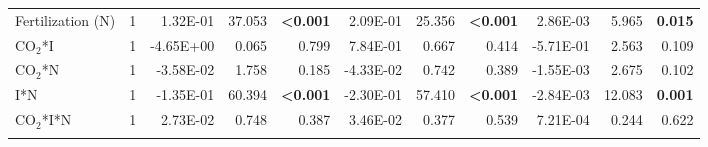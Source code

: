 \begin{landscape}
\begin{table}[]
{\begin{tabular}{p{3cm}p{0.5cm}p{1.75cm}p{1.5cm}p{1.5cm}p{1.75cm}p{1.5cm}p{1.5cm}p{1.75cm}p{1.5cm}p{1.5cm}}
            Fertilization (N) & \multicolumn{1}{r}{1}
            & \multicolumn{1}{r}{1.32E-01}      & \multicolumn{1}{r}{37.053}        & \multicolumn{1}{r}{\textbf{<0.001}}
            & \multicolumn{1}{r}{2.09E-01}      & \multicolumn{1}{r}{25.356}        & \multicolumn{1}{r}{\textbf{<0.001}}
            & \multicolumn{1}{r}{2.86E-03}      & \multicolumn{1}{r}{5.965}         & \multicolumn{1}{r}{\textbf{ 0.015}} 
            \\

            CO$_2$*I & \multicolumn{1}{r}{1}
            & \multicolumn{1}{r}{-4.65E+00}     & \multicolumn{1}{r}{0.065}         & \multicolumn{1}{r}{0.799}
            & \multicolumn{1}{r}{ 7.84E-01}     & \multicolumn{1}{r}{0.667}         & \multicolumn{1}{r}{0.414}
            & \multicolumn{1}{r}{-5.71E-01}     & \multicolumn{1}{r}{2.563}         & \multicolumn{1}{r}{0.109} 
            \\

            CO$_2$*N & \multicolumn{1}{r}{1}
            & \multicolumn{1}{r}{-3.58E-02}     & \multicolumn{1}{r}{1.758}         & \multicolumn{1}{r}{0.185}
            & \multicolumn{1}{r}{-4.33E-02}     & \multicolumn{1}{r}{0.742}         & \multicolumn{1}{r}{0.389}
            & \multicolumn{1}{r}{-1.55E-03}     & \multicolumn{1}{r}{2.675}         & \multicolumn{1}{r}{0.102} 
            \\

            I*N & \multicolumn{1}{r}{1}
            & \multicolumn{1}{r}{-1.35E-01}     & \multicolumn{1}{r}{60.394}        & \multicolumn{1}{r}{\textbf{<0.001}}
            & \multicolumn{1}{r}{-2.30E-01}     & \multicolumn{1}{r}{57.410}        & \multicolumn{1}{r}{\textbf{<0.001}}
            & \multicolumn{1}{r}{-2.84E-03}     & \multicolumn{1}{r}{12.083}        & \multicolumn{1}{r}{\textbf{0.001}} 
            \\

            CO$_2$*I*N & \multicolumn{1}{r}{1}
            & \multicolumn{1}{r}{2.73E-02}      & \multicolumn{1}{r}{0.748}         & \multicolumn{1}{r}{0.387}
            & \multicolumn{1}{r}{3.46E-02}      & \multicolumn{1}{r}{0.377}         & \multicolumn{1}{r}{0.539}
            & \multicolumn{1}{r}{7.21E-04}      & \multicolumn{1}{r}{0.244}         & \multicolumn{1}{r}{0.622} 
            \\

            \hline

            &&&&&&&&&&
            \\


\end{tabular}}
\end{table}
\end{landscape}

